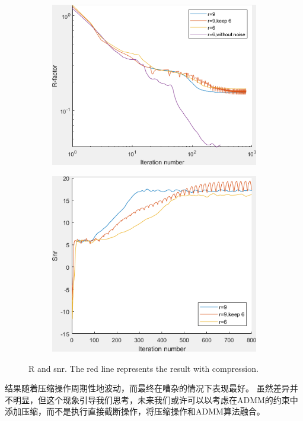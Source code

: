 \documentclass[12pt]{article}
\begin{document}
\begin{figure}
	\begin{subfigure}{.5\textwidth}
		\centering
		\includegraphics[width=0.9\linewidth]{../figures/noise_R.png}  
		\label{fig:noise_R}
	\end{subfigure}
	\begin{subfigure}{.5\textwidth}
		\centering
		\includegraphics[width=.8\linewidth]{../figures/noise_snr.png}  
		\label{fig:noise_snr}
	\end{subfigure}
	\caption{R and snr. The red line represents the result with compression.}
	\label{fig:noise}
\end{figure}

结果随着压缩操作周期性地波动，而最终在嘈杂的情况下表现最好。 虽然差异并不明显，但这个现象引导我们思考，未来我们或许可以以考虑在ADMM的约束中添加压缩，而不是执行直接截断操作，将压缩操作和ADMM算法融合。
\end{document}
